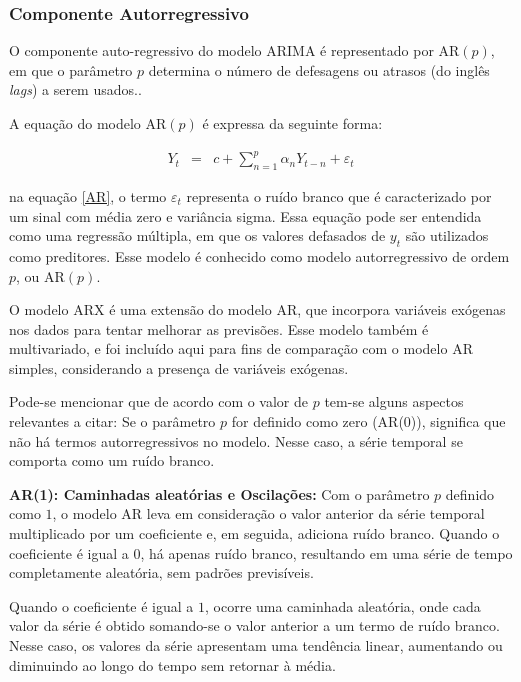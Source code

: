 \subsubsection{Componente Autorregressivo}

O componente auto-regressivo do modelo ARIMA é representado por AR$(p)$, em que o parâmetro $p$ determina o número de defesagens ou atrasos (do inglês \textit{lags}) a serem usados..

A equação do modelo AR$(p)$ é expressa da seguinte forma:

\begin{eqnarray}
	Y_t&=&c+\sum_{n=1}^{p} \alpha_n Y_{t-n} + \varepsilon_t\label{AR}
\end{eqnarray}


\noindent na equação \eqref{AR}, o termo $\varepsilon_t$ representa o ruído branco que é caracterizado por um sinal com média zero e variância sigma. Essa equação pode ser entendida como uma regressão múltipla, em que os valores defasados de $y_t$ são utilizados como preditores. Esse modelo é conhecido como modelo autorregressivo de ordem $p$, ou AR$(p)$.


O modelo ARX é uma extensão do modelo AR, que incorpora variáveis exógenas nos dados para tentar melhorar as previsões. Esse modelo também é multivariado, e foi incluído aqui para fins de comparação com o modelo AR simples, considerando a presença de variáveis exógenas.


Pode-se mencionar que de acordo com o valor de $p$ tem-se alguns aspectos relevantes a citar:
Se o parâmetro $p$ for definido como zero (AR($0$)), significa que não há termos autorregressivos no modelo. Nesse caso, a série temporal se comporta como um ruído branco. 



\textbf{AR(1): Caminhadas aleat\'orias e Oscila\c c\~oes: }
Com o parâmetro $p$ definido como $1$, o modelo AR leva em consideração o valor anterior da série temporal multiplicado por um coeficiente e, em seguida, adiciona ruído branco. Quando o coeficiente é igual a $0$, há apenas ruído branco, resultando em uma série de tempo completamente aleatória, sem padrões previsíveis.

Quando o coeficiente é igual a $1$, ocorre uma caminhada aleatória, onde cada valor da série é obtido somando-se o valor anterior a um termo de ruído branco. Nesse caso, os valores da série apresentam uma tendência linear, aumentando ou diminuindo ao longo do tempo sem retornar à média.

